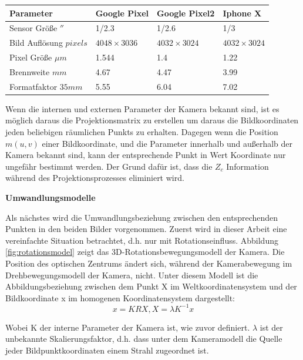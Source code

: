 \begin{table}[htb]
	\label{tbl:Parameter der Kameras im Vergleich}
	\footnotesize
	\centering
	\begin{tabular}{|p{3cm}|p{2.5cm}|p{2.5cm}|p{2.5cm}|}	%
	\toprule
	\textbf{Parameter} & \textbf{Google Pixel} & \textbf{Google Pixel2} & \textbf{Iphone X}\\
	\midrule
	Sensor Größe $''$ & 1/2.3 & 1/2.6 & 1/3 \\
	Bild Auflösung $pixels$ & $4048 \times 3036$ & $4032 \times 3024$ & $4032 \times 3024$ \\
	Pixel Größe $\mu m$ & 1.544 & 1.4 & 1.22 \\	
	Brennweite $mm$ & 4.67 & 4.47 & 3.99 \\
	Formatfaktor $35 mm$  	&5.55	&6.04	&7.02	\\
	
	\bottomrule
	\end{tabular}
\end{table} 


Wenn die internen und externen Parameter der Kamera bekannt sind, ist es möglich daraus die Projektionsmatrix zu erstellen um daraus die Bildkoordinaten jeden beliebigen räumlichen Punkts zu erhalten. Dagegen wenn die Position $m(u,v)$ einer Bildkoordinate, und die Parameter innerhalb und außerhalb der Kamera bekannt sind, kann der entsprechende Punkt in Wert Koordinate nur ungefähr bestimmt werden. Der Grund dafür ist, dass die $Z_c$ Information während des Projektionsprozesses eliminiert wird. 

\textbf{Umwandlungsmodelle}

Als nächstes wird die Umwandlungsbeziehung zwischen den entsprechenden Punkten in den beiden Bilder vorgenommen. Zuerst wird in dieser Arbeit eine vereinfachte Situation betrachtet, d.h. nur mit Rotationseinfluss. Abbildung \ref{fig:rotationsmodel} zeigt das 3D-Rotationsbewegungsmodell der Kamera. Die Position des optischen Zentrums ändert sich, während der Kamerabewegung im Drehbewegungsmodell der Kamera, nicht. Unter diesem Modell ist die Abbildungsbeziehung zwischen dem Punkt X im Weltkoordinatensystem und der Bildkoordinate x im homogenen Koordinatensystem dargestellt: 
\begin{equation}
   x = KRX, X = \lambda  K^{-1} x
\end{equation}

Wobei K der interne Parameter der Kamera ist, wie zuvor definiert. $\lambda$ ist der unbekannte Skalierungsfaktor, d.h. dass unter dem Kameramodell die Quelle jeder Bildpunktkoordinaten einem Strahl zugeordnet ist.


